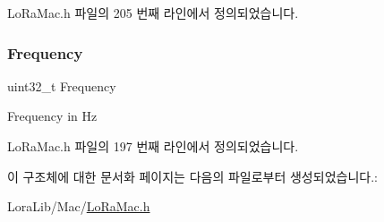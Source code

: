 Lo\+Ra\+Mac.\+h 파일의 205 번째 라인에서 정의되었습니다.

\mbox{\label{structs_rx2_channel_params_ade3d190636488dad9a89b19446b7acf1}} 
\subsubsection{\texorpdfstring{Frequency}{Frequency}}
{\footnotesize\ttfamily uint32\+\_\+t Frequency}

Frequency in Hz 

Lo\+Ra\+Mac.\+h 파일의 197 번째 라인에서 정의되었습니다.



이 구조체에 대한 문서화 페이지는 다음의 파일로부터 생성되었습니다.\+:\begin{DoxyCompactItemize}
\item 
Lora\+Lib/\+Mac/\mbox{\hyperlink{_lo_ra_mac_8h}{Lo\+Ra\+Mac.\+h}}\end{DoxyCompactItemize}
